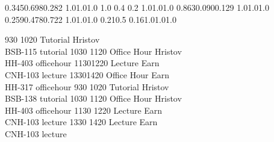 
\noindent{}

\setslotsize{3.1cm}{0.5cm}
\settextframe{0.8mm}




    {0.345}{0.698}{0.282} {1.0}{1.0}{1.0}
    {1.0} {0.4} {0.2} {1.0}{1.0}{1.0}
 {0.863}{0.090}{0.129} {1.0}{1.0}{1.0}
   {0.259}{0.478}{0.722} {1.0}{1.0}{1.0}
       {0.21}{0.5} {0.16}{1.0}{1.0}{1.0}

\begin{timetable}
   {930} {1020} {Tutorial}       {Hristov\\BSB-115} {}      {tutorial}
   {1030} {1120} {Office Hour}   {Hristov\\HH-403} {}      {officehour}
   {1130}{1220} {Lecture}        {Earn\\CNH-103}    {}      {lecture}
   {1330}{1420} {Office Hour}    {Earn\\HH-317}    {}      {officehour}
   {930} {1020} {Tutorial}       {Hristov\\BSB-138} {}      {tutorial}
   {1030} {1120} {Office Hour}   {Hristov\\HH-403} {}      {officehour}
   {1130} {1220} {Lecture}        {Earn\\CNH-103}   {}      {lecture}
   {1330} {1420} {Lecture}        {Earn\\CNH-103}   {}      {lecture}
\end{timetable}

